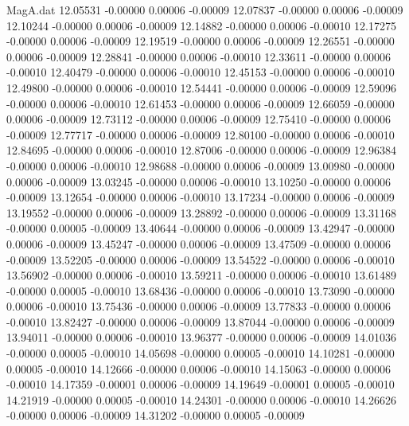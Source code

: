 \begin{filecontents}{MagA.dat}
  12.05531   -0.00000    0.00006   -0.00009
  12.07837   -0.00000    0.00006   -0.00009
  12.10244   -0.00000    0.00006   -0.00009
  12.14882   -0.00000    0.00006   -0.00010
  12.17275   -0.00000    0.00006   -0.00009
  12.19519   -0.00000    0.00006   -0.00009
  12.26551   -0.00000    0.00006   -0.00009
  12.28841   -0.00000    0.00006   -0.00010
  12.33611   -0.00000    0.00006   -0.00010
  12.40479   -0.00000    0.00006   -0.00010
  12.45153   -0.00000    0.00006   -0.00010
  12.49800   -0.00000    0.00006   -0.00010
  12.54441   -0.00000    0.00006   -0.00009
  12.59096   -0.00000    0.00006   -0.00010
  12.61453   -0.00000    0.00006   -0.00009
  12.66059   -0.00000    0.00006   -0.00009
  12.73112   -0.00000    0.00006   -0.00009
  12.75410   -0.00000    0.00006   -0.00009
  12.77717   -0.00000    0.00006   -0.00009
  12.80100   -0.00000    0.00006   -0.00010
  12.84695   -0.00000    0.00006   -0.00010
  12.87006   -0.00000    0.00006   -0.00009
  12.96384   -0.00000    0.00006   -0.00010
  12.98688   -0.00000    0.00006   -0.00009
  13.00980   -0.00000    0.00006   -0.00009
  13.03245   -0.00000    0.00006   -0.00010
  13.10250   -0.00000    0.00006   -0.00009
  13.12654   -0.00000    0.00006   -0.00010
  13.17234   -0.00000    0.00006   -0.00009
  13.19552   -0.00000    0.00006   -0.00009
  13.28892   -0.00000    0.00006   -0.00009
  13.31168   -0.00000    0.00005   -0.00009
  13.40644   -0.00000    0.00006   -0.00009
  13.42947   -0.00000    0.00006   -0.00009
  13.45247   -0.00000    0.00006   -0.00009
  13.47509   -0.00000    0.00006   -0.00009
  13.52205   -0.00000    0.00006   -0.00009
  13.54522   -0.00000    0.00006   -0.00010
  13.56902   -0.00000    0.00006   -0.00010
  13.59211   -0.00000    0.00006   -0.00010
  13.61489   -0.00000    0.00005   -0.00010
  13.68436   -0.00000    0.00006   -0.00010
  13.73090   -0.00000    0.00006   -0.00010
  13.75436   -0.00000    0.00006   -0.00009
  13.77833   -0.00000    0.00006   -0.00010
  13.82427   -0.00000    0.00006   -0.00009
  13.87044   -0.00000    0.00006   -0.00009
  13.94011   -0.00000    0.00006   -0.00010
  13.96377   -0.00000    0.00006   -0.00009
  14.01036   -0.00000    0.00005   -0.00010
  14.05698   -0.00000    0.00005   -0.00010
  14.10281   -0.00000    0.00005   -0.00010
  14.12666   -0.00000    0.00006   -0.00010
  14.15063   -0.00000    0.00006   -0.00010
  14.17359   -0.00001    0.00006   -0.00009
  14.19649   -0.00001    0.00005   -0.00010
  14.21919   -0.00000    0.00005   -0.00010
  14.24301   -0.00000    0.00006   -0.00010
  14.26626   -0.00000    0.00006   -0.00009
  14.31202   -0.00000    0.00005   -0.00009

\end{filecontents}
